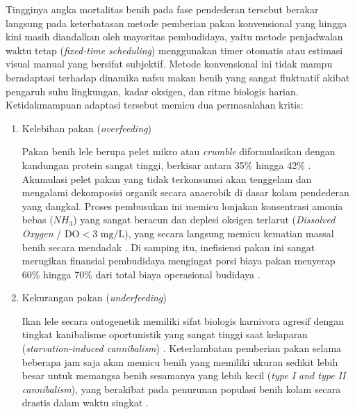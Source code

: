 Tingginya angka mortalitas benih pada fase pendederan tersebut berakar langsung pada keterbatasan metode pemberian pakan konvensional yang hingga kini masih diandalkan oleh mayoritas pembudidaya, yaitu metode penjadwalan waktu tetap (\textit{fixed-time scheduling}) menggunakan timer otomatis atau estimasi visual manual yang bersifat subjektif. Metode konvensional ini tidak mampu beradaptasi terhadap dinamika nafsu makan benih yang sangat fluktuatif akibat pengaruh suhu lingkungan, kadar oksigen, dan ritme biologis harian. Ketidakmampuan adaptasi tersebut memicu dua permasalahan kritis:
\begin{enumerate}
    \item Kelebihan pakan (\textit{overfeeding})
    
    Pakan benih lele berupa pelet mikro atau \textit{crumble} diformulasikan dengan kandungan protein sangat tinggi, berkisar antara 35\% hingga 42\% \cite{afia2020growth,jibrin2024effect}. Akumulasi pelet pakan yang tidak terkonsumsi akan tenggelam dan mengalami dekomposisi organik secara anaerobik di dasar kolam pendederan yang dangkal. Proses pembusukan ini memicu lonjakan konsentrasi amonia bebas ($NH_3$) yang sangat beracun dan deplesi oksigen terlarut (\textit{Dissolved Oxygen} / $\text{DO} < 3\text{ mg/L}$), yang secara langsung memicu kematian massal benih secara mendadak \cite{pelu2025pengaruh,Zhou2018}. Di samping itu, inefisiensi pakan ini sangat merugikan finansial pembudidaya mengingat porsi biaya pakan menyerap 60\% hingga 70\% dari total biaya operasional budidaya \cite{Li2020}.
    
    \item Kekurangan pakan (\textit{underfeeding})
    
    Ikan lele secara ontogenetik memiliki sifat biologis karnivora agresif dengan tingkat kanibalisme oportunistik yang sangat tinggi saat kelaparan (\textit{starvation-induced cannibalism}) \cite{gisbert2021development}. Keterlambatan pemberian pakan selama beberapa jam saja akan memicu benih yang memiliki ukuran sedikit lebih besar untuk memangsa benih sesamanya yang lebih kecil (\textit{type I and type II cannibalism}), yang berakibat pada penurunan populasi benih kolam secara drastis dalam waktu singkat \cite{Marliza2021,kurdowi2025technique}.
\end{enumerate}

